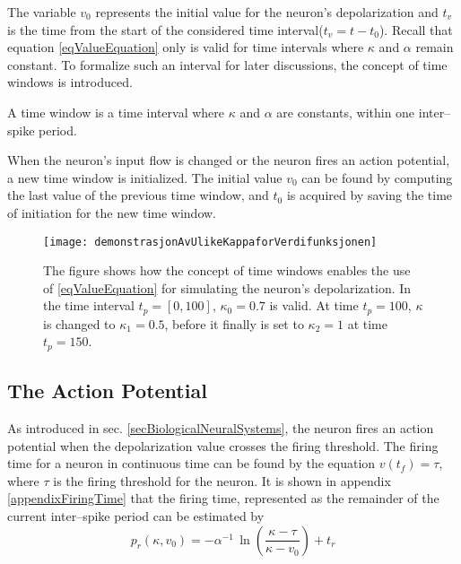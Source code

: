 	
		The variable $v_0$ represents the initial value for the neuron's depolarization and $t_v$ is the time from the start of the considered time interval\mbox{($t_v = t - t_0$)}.
		Recall that equation \ref{eqValueEquation} only is valid for time intervals where $\kappa$ and $\alpha$ remain constant.
		To formalize such an interval for later discussions, the concept of time windows is introduced. %
		\begin{mydef}
			A time window is a time interval where $\kappa$ and $\alpha$ are constants, within one inter--spike period.
			\label{defTimeWindow}
		\end{mydef}
		When the neuron's input flow is changed or the neuron fires an action potential, a new time window is initialized.
		The initial value $v_0$ can be found by computing the last value of the previous time window, and $t_0$ is acquired by saving the time of initiation for the new time window.


\begin{figure}[htb!p]
    \centering
    \texttt{[image: demonstrasjonAvUlikeKappaforVerdifunksjonen]}
 	  \caption{
			The figure shows how the concept of time windows enables the use of \eqref{eqValueEquation} for simulating the neuron's depolarization.
			In the time interval $t_p = [0, 100]$, $\kappa_0 = 0.7$ is valid.
			At time $t_p = 100$, $\kappa$ is changed to $\kappa_1 = 0.5$, before it finally is set to $\kappa_2 = 1$ at time $t_p = 150$.
			}
\end{figure}

	\subsection{The Action Potential}
	\label{ssecTheActionPotential}
	As introduced in sec. \ref{secBiologicalNeuralSystems}, the neuron fires an action potential when the depolarization value crosses the firing threshold.
	The firing time for a neuron in continuous time can be found by the equation $v(t_f) = \tau$, where $\tau$ is the firing threshold for the neuron.
	It is shown in appendix \ref{appendixFiringTime} that the firing time, represented as the remainder of the current inter--spike period can be estimated by %
\begin{equation}
	p_r(\kappa, v_0)  	= -\alpha^{-1} \, \ln \left( \frac{\kappa - \tau}{\kappa - v_0} \right) + t_r
	\label{eqEstimatedTimeToFiring}
\end{equation}

